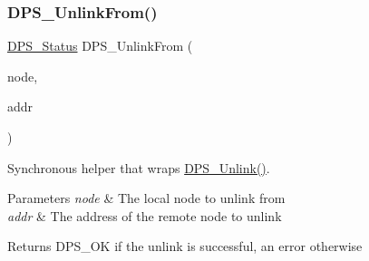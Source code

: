 \subsubsection{\texorpdfstring{D\+P\+S\+\_\+\+Unlink\+From()}{DPS\_UnlinkFrom()}}
{\footnotesize\ttfamily \hyperlink{group__status_ga30395a84d3cad9d4ec29848106415038}{D\+P\+S\+\_\+\+Status} D\+P\+S\+\_\+\+Unlink\+From (\begin{DoxyParamCaption}\item[{\hyperlink{group__node_ga4dd612ab965134321bb57fdb065f121c}{D\+P\+S\+\_\+\+Node} $\ast$}]{node,  }\item[{\hyperlink{group__nodeaddress_ga9e9f56aa38e82b4edcef7eb81e9f5bd2}{D\+P\+S\+\_\+\+Node\+Address} $\ast$}]{addr }\end{DoxyParamCaption})}



Synchronous helper that wraps \hyperlink{group__node_ga79c86c3c0c5d6438b953a9acaab0ab0b}{D\+P\+S\+\_\+\+Unlink()}. 


\begin{DoxyParams}{Parameters}
{\em node} & The local node to unlink from \\
\hline
{\em addr} & The address of the remote node to unlink\\
\hline
\end{DoxyParams}
\begin{DoxyReturn}{Returns}
D\+P\+S\+\_\+\+OK if the unlink is successful, an error otherwise 
\end{DoxyReturn}
